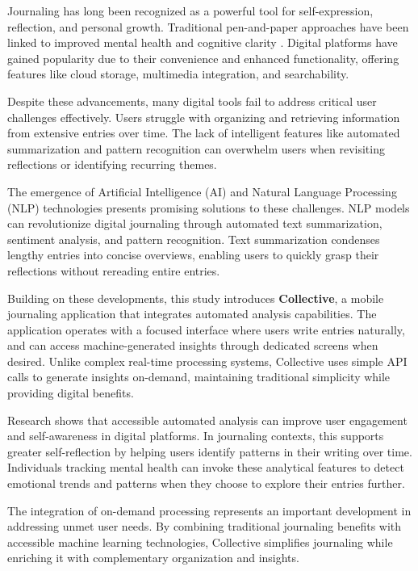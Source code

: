 Journaling has long been recognized as a powerful tool for self-expression, reflection, and personal growth. Traditional pen-and-paper approaches have been linked to improved mental health and cognitive clarity \cite{pennebaker1999forming}. Digital platforms have gained popularity due to their convenience and enhanced functionality, offering features like cloud storage, multimedia integration, and searchability.

Despite these advancements, many digital tools fail to address critical user challenges effectively. Users struggle with organizing and retrieving information from extensive entries over time. The lack of intelligent features like automated summarization and pattern recognition can overwhelm users when revisiting reflections or identifying recurring themes.

The emergence of Artificial Intelligence (AI) and Natural Language Processing (NLP) technologies presents promising solutions to these challenges. NLP models can revolutionize digital journaling through automated text summarization, sentiment analysis, and pattern recognition. Text summarization condenses lengthy entries into concise overviews, enabling users to quickly grasp their reflections without rereading entire entries.

Building on these developments, this study introduces \textbf{Collective}, a mobile journaling application that integrates automated analysis capabilities. The application operates with a focused interface where users write entries naturally, and can access machine-generated insights through dedicated screens when desired. Unlike complex real-time processing systems, Collective uses simple API calls to generate insights on-demand, maintaining traditional simplicity while providing digital benefits.

Research shows that accessible automated analysis can improve user engagement and self-awareness in digital platforms. In journaling contexts, this supports greater self-reflection by helping users identify patterns in their writing over time. Individuals tracking mental health can invoke these analytical features to detect emotional trends and patterns when they choose to explore their entries further.

The integration of on-demand processing represents an important development in addressing unmet user needs. By combining traditional journaling benefits with accessible machine learning technologies, Collective simplifies journaling while enriching it with complementary organization and insights.

